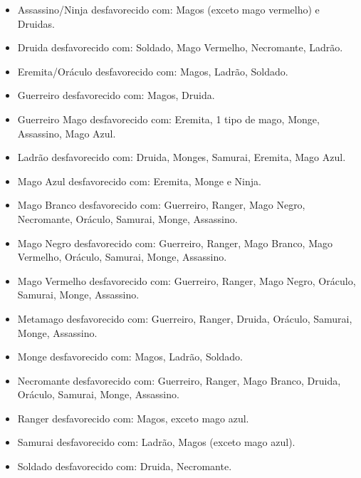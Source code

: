 \begin{itemize}
	\item Assassino/Ninja desfavorecido com: Magos (exceto mago vermelho) e Druidas.

	\item Druida desfavorecido com: Soldado, Mago Vermelho, Necromante, Ladrão.

	\item Eremita/Oráculo desfavorecido com: Magos, Ladrão, Soldado.

	\item Guerreiro desfavorecido com: Magos, Druida.

	\item Guerreiro Mago desfavorecido com: Eremita, 1 tipo de mago, Monge, Assassino, Mago Azul.

	\item Ladrão desfavorecido com: Druida, Monges, Samurai, Eremita, Mago Azul.

	\item Mago Azul desfavorecido com: Eremita, Monge e Ninja.

	\item Mago Branco desfavorecido com: Guerreiro, Ranger, Mago Negro, Necromante, Oráculo, Samurai, Monge, Assassino.
	
	\item Mago Negro desfavorecido com: Guerreiro, Ranger, Mago Branco, Mago Vermelho, Oráculo, Samurai, Monge, Assassino.
	
	\item Mago Vermelho desfavorecido com: Guerreiro, Ranger, Mago Negro, Oráculo, Samurai, Monge, Assassino.
	
	\item Metamago desfavorecido com: Guerreiro, Ranger, Druida, Oráculo, Samurai, Monge, Assassino.
	
	\item Monge desfavorecido com: Magos, Ladrão, Soldado.

	\item Necromante desfavorecido com: Guerreiro, Ranger, Mago Branco, Druida, Oráculo, Samurai, Monge, Assassino.

	\item Ranger desfavorecido com: Magos, exceto mago azul.

	\item Samurai desfavorecido com: Ladrão, Magos (exceto mago azul).
	
	\item Soldado desfavorecido com: Druida, Necromante.
	
\end{itemize}

